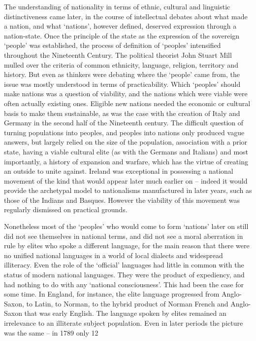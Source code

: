 The understanding of nationality in terms of ethnic, cultural and linguistic distinctiveness came later, in the course of intellectual debates about what made a nation, and what ‘nations’, however defined, deserved expression through a nation-state. Once the principle of the state as the expression of the sovereign ‘people’ was established, the process of definition of ‘peoples’ intensified throughout the Nineteenth Century. The political theorist John Stuart Mill mulled over the criteria of common ethnicity, language, religion, territory and history. But even as thinkers were debating where the ‘people’ came from, the issue was mostly understood in terms of practicability. Which ‘peoples’ should make nations was a question of viability, and the nations which were viable were often actually existing ones. Eligible new nations needed the economic or cultural basis to make them sustainable, as was the case with the creation of Italy and Germany in the second half of the Nineteenth century. The difficult question of turning populations into peoples, and peoples into nations only produced vague answers, but largely relied on the size of the population, association with a prior state, having a viable cultural elite (as with the Germans and Italians) and most importantly, a history of expansion and warfare, which has the virtue of creating an outside to unite against. Ireland was exceptional in possessing a national movement of the kind that would appear later much earlier on – indeed it would provide the archetypal model to nationalisms manufactured in later years, such as those of the Indians and Basques. However the viability of this movement was regularly dismissed on practical grounds.

Nonetheless most of the ‘peoples’ who would come to form ‘nations’ later on still did not see themselves in national terms, and did not see a moral aberration in rule by elites who spoke a different language, for the main reason that there were no unified national languages in a world of local dialects and widespread illiteracy. Even the role of the ‘official’ languages had little in common with the status of modern national languages. They were the product of expediency, and had nothing to do with any ‘national consciousness’. This had been the case for some time. In England, for instance, the elite language progressed from Anglo-Saxon, to Latin, to Norman, to the hybrid product of Norman French and Anglo-Saxon that was early English. The language spoken by elites remained an irrelevance to an illiterate subject population. Even in later periods the picture was the same – in 1789 only 12%

